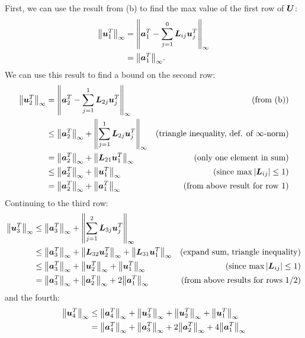 \documentclass[twoside,10pt]{article}
\begin{document}
First, we can use the result from (b) to find the max value of the first row of $\bm{U}$:
\begin{align*}
  \left\|\vct{u}_1^T\right\|_{\infty} &= \left\|\mtx{a}^T_{1} - \sum_{j=1}^{0} \mtx{L}_{ij}\mtx{u}^T_{j}\right\|_{\infty}\\
  &= \left\|\vct{a}_1^T\right\|_{\infty}.
\end{align*}
We can use this result to find a bound on the second row:
\begin{align*}
  \left\|\vct{u}_2^T\right\|_{\infty} &= \left\|\mtx{a}^T_{2} - \sum_{j=1}^{1} \mtx{L}_{2j}\mtx{u}^T_{j}\right\|_{\infty}&\text{(from (b))}\\
  &\leq \left\|\mtx{a}^T_{2}\right\|_{\infty} + \left\|\sum_{j=1}^{1} \mtx{L}_{2j}\mtx{u}^T_{j}\right\|_{\infty}&\text{(triangle inequality, def. of $\infty$-norm)}\\
  &= \left\|\mtx{a}^T_{2}\right\|_{\infty} + \left\|\mtx{L}_{21}\mtx{u}^T_{1}\right\|_{\infty}&\text{(only one element in sum)}\\
  &\leq \left\|\mtx{a}^T_{2}\right\|_{\infty} + \left\|\mtx{u}^T_{1}\right\|_{\infty}&\text{(since $\max{\left|\mtx{L}_{ij}\right|} \leq 1$)}\\
  &= \left\|\mtx{a}^T_{2}\right\|_{\infty} + \left\|\mtx{a}^T_{1}\right\|_{\infty}&\text{(from above result for row 1)}\\
\end{align*}
Continuing to the third row:
\begin{align*}
  \left\|\vct{u}_3^T\right\|_{\infty} &\leq \left\|\mtx{a}^T_{3}\right\|_{\infty} + \left\|\sum_{j=1}^{2} \mtx{L}_{3j}\mtx{u}^T_{j}\right\|_{\infty}\\
  &\leq \left\|\mtx{a}^T_{3}\right\|_{\infty} + \left\|\mtx{L}_{32}\mtx{u}^T_{2}\right\|_{\infty} + \left\|\mtx{L}_{31}\mtx{u}^T_{1}\right\|_{\infty}&\text{(expand sum, triangle inequality)}\\
  &\leq \left\|\mtx{a}^T_{3}\right\|_{\infty} + \left\|\mtx{u}^T_{2}\right\|_{\infty} + \left\|\mtx{u}^T_{1}\right\|_{\infty} &\text{(since $\max{\left|\mtx{L}_{ij}\right|} \leq 1$)}\\
  &= \left\|\mtx{a}^T_{3}\right\|_{\infty} + \left\|\mtx{a}^T_{2}\right\|_{\infty} + 2\left\|\mtx{a}^T_{1}\right\|_{\infty}&\text{(from above results for rows 1/2)}\\
\end{align*}
and the fourth:
\begin{align*}
  \left\|\vct{u}_4^T\right\|_{\infty} &\leq \left\|\mtx{a}^T_{4}\right\|_{\infty} + \left\|\mtx{u}^T_{3}\right\|_{\infty} + \left\|\mtx{u}^T_{2}\right\|_{\infty} + \left\|\mtx{u}^T_{1}\right\|_{\infty}\\
  &=\left\|\mtx{a}^T_{4}\right\|_{\infty} + \left\|\mtx{a}^T_{3}\right\|_{\infty} + 2\left\|\mtx{a}^T_{2}\right\|_{\infty} + 4\left\|\mtx{a}^T_{1}\right\|_{\infty}\\
\end{align*}
\end{document}
